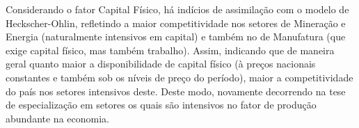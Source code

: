 Considerando o fator Capital Físico, há indícios de assimilação com o modelo de Heckscher-Ohlin, refletindo a maior competitividade nos setores de Mineração e Energia (naturalmente intensivos em capital) e também no de Manufatura (que exige capital físico, mas também trabalho). Assim, indicando que de maneira geral quanto maior a disponibilidade de capital físico (à preços nacionais constantes e também sob os níveis de preço do período), maior a competitividade do país nos setores intensivos deste. Deste modo, novamente decorrendo na tese de especialização em setores os quais são intensivos no fator de produção abundante na economia.


\clearpage
